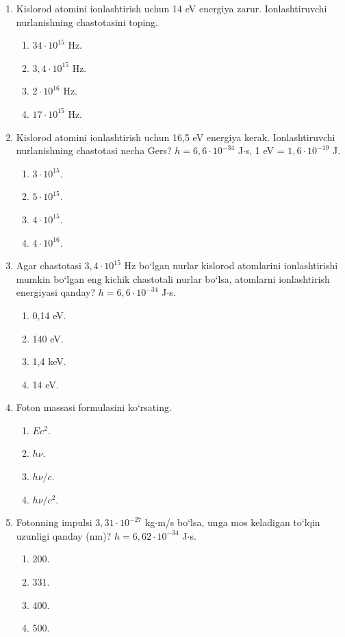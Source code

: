 \begin{enumerate}
\item Kislorod atomini ionlashtirish uchun 14 eV energiya zarur. Ionlashtiruvchi nurlanishning chastotasini toping.
\begin{enumerate}[label=\Alph*)]
\item $34\cdot 10^{15}$ Hz.
\item $3,4\cdot 10^{15}$ Hz.
\item $2\cdot 10^{16}$ Hz.
\item $17\cdot 10^{15}$ Hz.
\end{enumerate}

\item Kislorod atomini ionlashtirish uchun 16,5 eV energiya kerak. Ionlashtiruvchi nurlanishning chastotasi necha Gers? $h = 6,6\cdot 10^{-34}$ J$\cdot$s, 1 eV = $1,6\cdot 10^{-19}$ J.
\begin{enumerate}[label=\Alph*)]
\item $3\cdot 10^{15}$.
\item $5\cdot 10^{15}$.
\item $4\cdot 10^{15}$.
\item $4\cdot 10^{16}$.
\end{enumerate}

\item Agar chastotasi $3,4\cdot 10^{15}$ Hz bo‘lgan nurlar kislorod atomlarini ionlashtirishi mumkin bo‘lgan eng kichik chastotali nurlar bo‘lsa, atomlarni ionlashtirish energiyasi qanday? $h = 6,6\cdot 10^{-34}$ J$\cdot$s.
\begin{enumerate}[label=\Alph*)]
\item 0,14 eV.
\item 140 eV.
\item 1,4 keV.
\item 14 eV.
\end{enumerate}

\item Foton massasi formulasini ko‘rsating.
\begin{enumerate}[label=\Alph*)]
\item $Ec^2$.
\item $h\nu$.
\item $h\nu/c$.
\item $h\nu/c^2$.
\end{enumerate}

\item Fotonning impulsi $3,31\cdot 10^{-27}$ kg$\cdot$m/s bo‘lsa, unga mos keladigan to‘lqin uzunligi qanday (nm)? $h = 6,62\cdot 10^{-34}$ J$\cdot$s.
\begin{enumerate}[label=\Alph*)]
\item 200.
\item 331.
\item 400.
\item 500.
\end{enumerate}


\end{enumerate}
